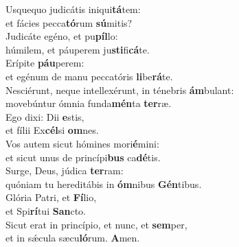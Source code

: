 \evenverse Usquequo judicátis iniqui\textbf{tá}tem:~\*\\
\evenverse et fácies pecca\textbf{tó}rum \textbf{sú}mitis?\\
\oddverse Judicáte egéno, et pu\textbf{píl}lo:~\*\\
\oddverse húmilem, et páuperem ju\textbf{sti}fi\textbf{cá}te.\\
\evenverse Erípite \textbf{páu}perem:~\*\\
\evenverse et egénum de manu peccatóris \textbf{li}be\textbf{rá}te.\\
\oddverse Nesciérunt, neque intellexérunt, in ténebris \textbf{ám}bulant:~\*\\
\oddverse movebúntur ómnia funda\textbf{mén}ta \textbf{ter}ræ.\\
\evenverse Ego dixi: Dii \textbf{e}stis,~\*\\
\evenverse et fílii Ex\textbf{cél}si \textbf{om}nes.\\
\oddverse Vos autem sicut hómines mori\textbf{é}mini:~\*\\
\oddverse et sicut unus de princípi\textbf{bus} ca\textbf{dé}tis.\\
\evenverse Surge, Deus, júdica \textbf{ter}ram:~\*\\
\evenverse quóniam tu hereditábis in \textbf{óm}nibus \textbf{Gén}tibus.\\
\oddverse Glória Patri, et \textbf{Fí}lio,~\*\\
\oddverse et Spi\textbf{rí}tui \textbf{San}cto.\\
\evenverse Sicut erat in princípio, et nunc, et \textbf{sem}per,~\*\\
\evenverse et in sǽcula sæcu\textbf{ló}rum. \textbf{A}men.\\
